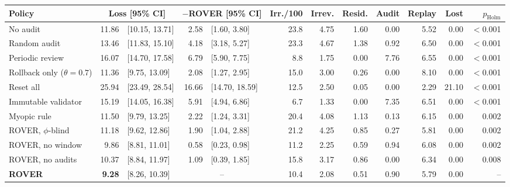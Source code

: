 \footnotesize
\setlength{\tabcolsep}{3.6pt}
\begin{tabular}{@{}l r@{\,}l r@{\,}l r rrrrr r@{}}
\toprule
Policy & \multicolumn{2}{c}{Loss [95\% CI]} & \multicolumn{2}{c}{$-$ROVER [95\% CI]} & Irr./100 & Irrev. & Resid. & Audit & Replay & Lost & $p_{\mathrm{Holm}}$ \\
\midrule
No audit & 11.86 & [10.15, 13.71] & 2.58 & [1.60, 3.80] & 23.8 & 4.75 & 1.60 & 0.00 & 5.52 & 0.00 & $<$0.001 \\
Random audit & 13.46 & [11.83, 15.10] & 4.18 & [3.18, 5.27] & 23.3 & 4.67 & 1.38 & 0.92 & 6.50 & 0.00 & $<$0.001 \\
Periodic review & 16.07 & [14.70, 17.58] & 6.79 & [5.90, 7.75] & 8.8 & 1.75 & 0.00 & 7.76 & 6.55 & 0.00 & $<$0.001 \\
Rollback only ($\theta=0.7$) & 11.36 & [9.75, 13.09] & 2.08 & [1.27, 2.95] & 15.0 & 3.00 & 0.26 & 0.00 & 8.10 & 0.00 & $<$0.001 \\
Reset all & 25.94 & [23.49, 28.54] & 16.66 & [14.70, 18.59] & 12.5 & 2.50 & 0.05 & 0.00 & 2.29 & 21.10 & $<$0.001 \\
Immutable validator & 15.19 & [14.05, 16.38] & 5.91 & [4.94, 6.86] & 6.7 & 1.33 & 0.00 & 7.35 & 6.51 & 0.00 & $<$0.001 \\
Myopic rule & 11.50 & [9.79, 13.25] & 2.22 & [1.24, 3.31] & 20.4 & 4.08 & 1.13 & 0.13 & 6.15 & 0.00 & 0.002 \\
\midrule
ROVER, $\phi$-blind & 11.18 & [9.62, 12.86] & 1.90 & [1.04, 2.88] & 21.2 & 4.25 & 0.85 & 0.27 & 5.81 & 0.00 & 0.002 \\
ROVER, no window & 9.86 & [8.81, 11.01] & 0.58 & [0.23, 0.98] & 11.2 & 2.25 & 0.59 & 0.94 & 6.08 & 0.00 & 0.002 \\
ROVER, no audits & 10.37 & [8.84, 11.97] & 1.09 & [0.39, 1.85] & 15.8 & 3.17 & 0.86 & 0.00 & 6.34 & 0.00 & 0.008 \\
\textbf{ROVER} & \textbf{9.28} & [8.26, 10.39] & \multicolumn{2}{c}{--} & 10.4 & 2.08 & 0.51 & 0.90 & 5.79 & 0.00 & -- \\
\bottomrule
\end{tabular}

